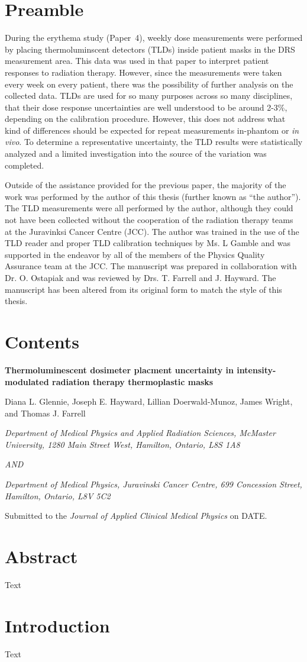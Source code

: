 \section*{Preamble}
During the erythema study (Paper~4), weekly dose measurements were performed by placing thermoluminscent detectors (TLDs) inside patient masks in the DRS measurement area. This data was used in that paper to interpret patient responses to radiation therapy. However, since the measurements were taken every week on every patient, there was the possibility of further analysis on the collected data. TLDs are used for so many purposes across so many disciplines, that their dose response uncertainties are well understood to be around 2-3\%, depending on the calibration procedure. However, this does not address what kind of differences should be expected for repeat measurements in-phantom or \emph{in vivo}. To determine a representative uncertainty, the TLD results were statistically analyzed and a limited investigation into the source of the variation was completed.

Outside of the assistance provided for the previous paper, the majority of the work was performed by the author of this thesis (further known as ``the author''). The TLD measurements were all performed by the author, although they could not have been collected without the cooperation of the radiation therapy teams at the Juravinksi Cancer Centre (JCC). The author was trained in the use of the TLD reader and proper TLD calibration techniques by Ms. L Gamble and was supported in the endeavor by all of the members of the Physics Quality Assurance team at the JCC. The manuscript was prepared in collaboration with Dr. O. Ostapiak and was reviewed by Drs. T. Farrell and J. Hayward. The manuscript has been altered from its original form to match the style of this thesis.

\section*{Contents}

\begin{center}
	
	\textbf{Thermoluminescent dosimeter placment uncertainty in intensity-modulated radiation therapy thermoplastic masks}
	
	Diana L. Glennie, Joseph E. Hayward, Lillian Doerwald-Munoz, James Wright, and Thomas J. Farrell
	
	\textit{Department of Medical Physics and Applied Radiation Sciences, McMaster University, 1280 Main Street West, Hamilton, Ontario, L8S 1A8}
	
	\textit{AND}
	
	\textit{Department of Medical Physics, Juravinski Cancer Centre, 699 Concession Street, Hamilton, Ontario, L8V 5C2}
	
\end{center}

\noindent Submitted to the \textit{Journal of Applied Clinical Medical Physics} on DATE.

\section*{Abstract}
Text

\section{Introduction}
Text